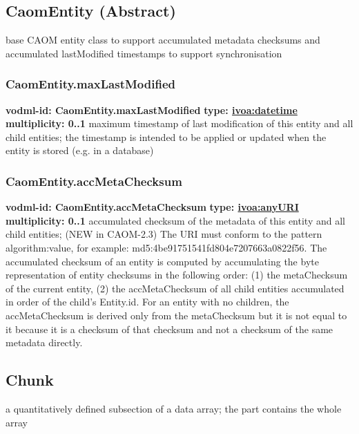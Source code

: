  \subsection{CaomEntity (Abstract)}
  \label{sect:CaomEntity}
    base CAOM entity class to support accumulated metadata checksums and accumulated lastModified timestamps to support synchronisation

    \subsubsection{CaomEntity.maxLastModified}
      \textbf{vodml-id: CaomEntity.maxLastModified} \newline
      \textbf{type: \hyperref[sect:ivoa]{ivoa:datetime}} \newline
      \textbf{multiplicity: 0..1} \newline
      maximum timestamp of last modification of this entity and all child entities; the timestamp is intended to be applied or updated when the entity is stored (e.g. in a database)

    \subsubsection{CaomEntity.accMetaChecksum}
      \textbf{vodml-id: CaomEntity.accMetaChecksum} \newline
      \textbf{type: \hyperref[sect:ivoa]{ivoa:anyURI}} \newline
      \textbf{multiplicity: 0..1} \newline
      accumulated checksum of the metadata of this entity and all child entities; (NEW in CAOM-2.3) The URI must conform to the pattern {algorithm}:{value}, for example: md5:4be91751541fd804e7207663a0822f56. The accumulated checksum of an entity is computed by accumulating the byte representation of entity checksums in the following order: (1) the metaChecksum of the current entity, (2) the accMetaChecksum of all child entities accumulated in order of the child's Entity.id. For an entity with no children, the accMetaChecksum is derived only from the metaChecksum but it is not equal to it because it is a checksum of that checksum and not a checksum of the same metadata directly.

  \subsection{Chunk}
  \label{sect:Chunk}
    a quantitatively defined subsection of a data array; the part contains the whole array

